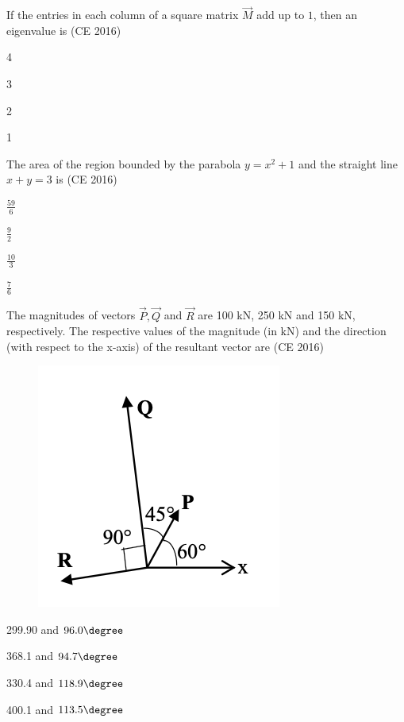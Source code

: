 \item If the entries in each column of a square matrix $\vec{M}$ add up to $1$, then an eigenvalue is \hfill (CE 2016)
\begin{enumerate}
\begin{multicols}{4}
\item 4
\item 3
\item 2
\item 1
\end{multicols}
\end{enumerate}

\item The area of the region bounded by the parabola $y = x^2 + 1$ and the straight line $x + y = 3$ is \hfill (CE 2016)
\begin{enumerate}
\begin{multicols}{4}
\item $\frac{59}{6}$
\item $\frac{9}{2}$
\item $\frac{10}{3}$
\item $\frac{7}{6}$
\end{multicols}
\end{enumerate}

\item The magnitudes of vectors $\vec{P}, \vec{Q}$ and $\vec{R}$ are 100 kN, 250 kN and 150 kN, respectively. The respective values of the magnitude (in kN) and the direction (with respect to the x-axis) of the resultant vector are \hfill (CE 2016)

\begin{figure}[H]
    \centering
    \includegraphics[width=0.5\columnwidth]{GATE/2016/CE/figs/Q39.png} 
    \caption{}
    \label{fig:placeholder}
\end{figure}

\begin{enumerate}
\begin{multicols}{4}
\item 299.90 and $96.0\degree$
\item 368.1 and $94.7\degree$
\item 330.4 and $118.9\degree$
\item 400.1 and $113.5\degree$
\end{multicols}
\end{enumerate}

